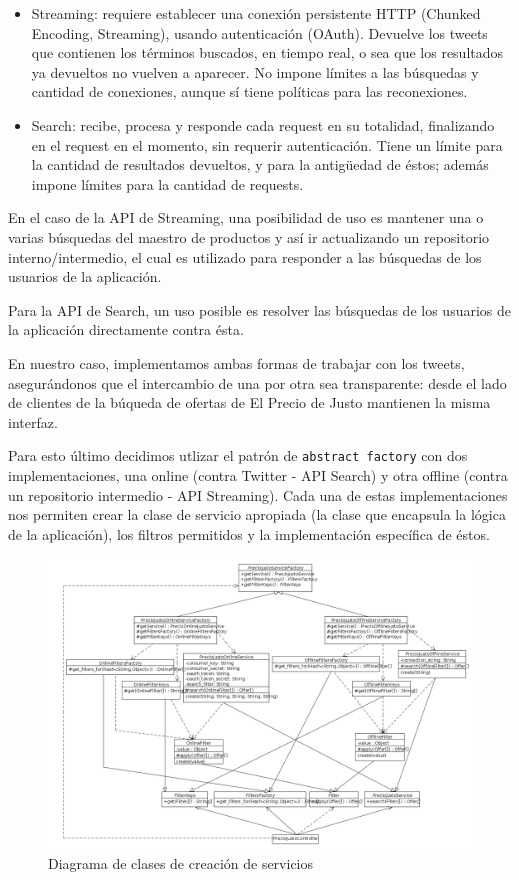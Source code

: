 \begin{itemize}
\item Streaming: requiere establecer una conexi\'on persistente HTTP (Chunked Encoding, Streaming), usando autenticaci\'on (OAuth). Devuelve los tweets que contienen los t\'erminos buscados, en tiempo real, o sea que los resultados ya devueltos no vuelven a aparecer. No impone l\'imites a las b\'usquedas y cantidad de conexiones, aunque s\'i tiene pol\'iticas para las reconexiones.
\item Search: recibe, procesa y responde cada request en su totalidad, finalizando en el request en el momento, sin requerir autenticaci\'on. Tiene un l\'imite para la cantidad de resultados devueltos, y para la antig\"uedad de \'estos; adem\'as impone l\'imites para la cantidad de requests.
\end{itemize}

En el caso de la API de Streaming, una posibilidad de uso es mantener una o varias b\'usquedas del maestro de productos y as\'i ir actualizando un repositorio interno/intermedio, el cual es utilizado para responder a las b\'usquedas de los usuarios de la aplicaci\'on.

Para la API de Search, un uso posible es resolver las b\'usquedas de los usuarios de la aplicaci\'on directamente contra \'esta.

En nuestro caso, implementamos ambas formas de trabajar con los tweets, asegur\'andonos que el intercambio de una por otra sea transparente: desde el lado de clientes de la b\'uqueda de ofertas de El Precio de Justo mantienen la misma interfaz.

Para esto \'ultimo decidimos utlizar el patr\'on de \texttt{abstract factory} con dos
implementaciones, una online (contra Twitter - API Search) y otra offline (contra un repositorio intermedio - API Streaming). Cada una de estas implementaciones nos permiten crear la clase de servicio apropiada (la clase que encapsula la l\'ogica de la aplicaci\'on), los filtros permitidos y la implementaci\'on espec\'ifica de \'estos.

\begin{figure}[h]
\centerline{\includegraphics[width=0.44\paperwidth]{./imgs/class_diagram_service_factory_v2.png}}
\caption{Diagrama de clases de creaci\'on de servicios}
\label{fig:class_service_factory} 
\end{figure}

